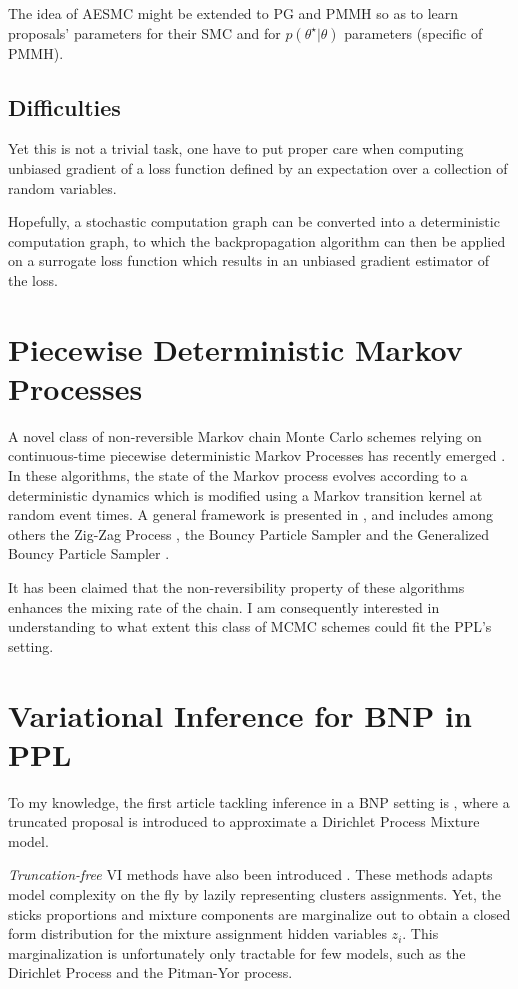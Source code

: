 The idea of AESMC \cite{Le:2017wm} might be extended to \gls{PG} and \gls{PMMH} so as to learn proposals' parameters for their \gls{SMC} and for $p(\theta^\star|\theta)$ parameters (specific of \gls{PMMH}).

\subsection{Difficulties}
Yet this is not a trivial task, one have to put proper care when computing unbiased gradient of a loss function defined by an expectation over a collection of random variables.

Hopefully, a stochastic computation graph \cite{Schulman:2015wk} can be converted into a deterministic computation graph, to which the backpropagation algorithm can then be applied on a surrogate loss function which results in an unbiased gradient estimator of the loss.


\section{Piecewise Deterministic Markov Processes}
A novel class of non-reversible Markov chain Monte Carlo schemes relying on continuous-time piecewise deterministic Markov Processes has recently emerged \cite{Vanetti:2017ux}. In these algorithms, the state of the Markov process evolves according to a deterministic dynamics which is modified using a Markov transition kernel at random event times. A general framework is presented in \cite{Bierkens:2017we}, and includes among others the Zig-Zag Process \cite{Bierkens:2016uk}, the Bouncy Particle Sampler \cite{BouchardCote:2017gs} and the Generalized Bouncy Particle Sampler \cite{Wu:2017uz}.


It has been claimed \cite{Bierkens:2017we} that the non-reversibility property of these algorithms enhances the mixing rate of the chain.
I am consequently interested in understanding to what extent this class of MCMC schemes could fit the \gls{PPL}'s setting.


\section{Variational Inference for \gls{BNP} in \gls{PPL}}
To my knowledge, the first article tackling inference in a \gls{BNP} setting is \cite{Blei:2006fo}, where
a truncated proposal is introduced to approximate a Dirichlet Process Mixture model.

\textit{Truncation-free} \gls{VI} methods have also been introduced \cite{Blei:2012uu}. These methods adapts model complexity on the fly by lazily representing clusters assignments. Yet, the sticks proportions and mixture components are marginalize out to obtain a closed form distribution for the mixture assignment hidden variables $z_i$. This marginalization is unfortunately only tractable for few models, such as the Dirichlet Process and the Pitman-Yor process.

